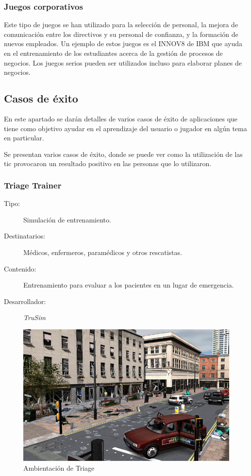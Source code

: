 \subsubsection{Juegos corporativos}

Este tipo de juegos se han utilizado para la selección de personal, la mejora de
comunicación entre los directivos y su personal de confianza, y la formación de
nuevos empleados. Un ejemplo de estos juegos es el INNOV8 de IBM que ayuda en el
entrenamiento de los estudiantes acerca de la gestión de procesos de negocios.
Los juegos serios pueden ser utilizados incluso para elaborar planes de
negocios\cite{education:games}. 

\subsection{Casos de éxito}

En este apartado se darán detalles de varios casos de éxito de aplicaciones que
tiene  como objetivo ayudar en el aprendizaje del usuario o jugador en algún
tema en particular.

Se presentan varios casos de éxito, donde se puede ver como la utilización de
las \Gls{tic} provocaron un resultado positivo en las personas que lo
utilizaron.

\subsubsection{Triage Trainer}
	

\begin{description}
\item[Tipo:] Simulación de entrenamiento.
\item[Destinatarios:] Médicos, enfermeros, paramédicos y otros rescatistas.
\item[Contenido:] Entrenamiento para evaluar a los pacientes en un lugar de
  emergencia.
\item[Desarrollador:] \emph{TruSim}
\end{description}

\begin{figure}[ht!] 
\centering 
\includegraphics[scale=0.5]{tics/images/triage.png}
\caption{Ambientación de Triage}
\label{fig:triage}
\end{figure}

